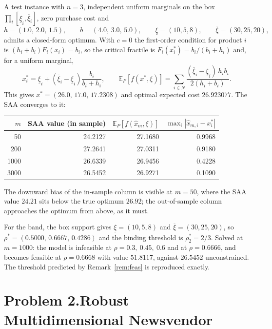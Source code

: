 \documentclass[11pt]{article}
\theoremstyle{definition}
\begin{document}
A test instance with $n = 3$, independent uniform marginals on the box
$\prod_i [\underline{\xi}_i,\overline{\xi}_i]$, zero purchase cost and
\[
  h = (1.0,\,2.0,\,1.5), \qquad b = (4.0,\,3.0,\,5.0), \qquad
  \underline{\xi} = (10,5,8), \qquad \overline{\xi} = (30,25,20),
\]
admits a closed-form optimum. With $c=0$ the first-order condition for
product $i$ is $(h_i+b_i)F_i(x_i) = b_i$, so the critical fractile is
$F_i(x^{*}_i) = b_i/(b_i+h_i)$ and, for a uniform marginal,
\[
  x^{*}_i = \underline{\xi}_i
    + (\overline{\xi}_i - \underline{\xi}_i)\frac{b_i}{b_i+h_i},
  \qquad
  \mathbb{E}_P[f(x^{*},\xi)]
    = \sum_{i \in N}
      \frac{(\overline{\xi}_i-\underline{\xi}_i)\,h_i b_i}{2(h_i+b_i)} .
\]
This gives $x^{*} = (26.0,\,17.0,\,17.2308)$ and optimal expected cost
$26.923077$. The SAA converges to it:

\begin{center}
\begin{tabular}{@{}rrrr@{}}
\toprule
$m$ & SAA value (in sample) & $\mathbb{E}_P[f(\hat x_m,\xi)]$ &
  $\max_i |\hat x_{m,i} - x^{*}_i|$ \\
\midrule
50   & 24.2127 & 27.1680 & 0.9968 \\
200  & 27.2641 & 27.0311 & 0.9180 \\
1000 & 26.6339 & 26.9456 & 0.4228 \\
3000 & 26.5452 & 26.9271 & 0.1090 \\
\bottomrule
\end{tabular}
\end{center}

The downward bias of the in-sample column is visible at $m=50$, where the
SAA value $24.21$ sits below the true optimum $26.92$; the out-of-sample
column approaches the optimum from above, as it must.

For the band, the box support gives $\underline{\xi} = (10,5,8)$ and
$\overline{\xi} = (30,25,20)$, so
$\rho^{*} = (0.5000,\,0.6667,\,0.4286)$ and the binding threshold is
$\rho^{*}_2 = 2/3$. Solved at $m=1000$: the model is infeasible at
$\rho = 0.3,\ 0.45,\ 0.6$ and at $\rho = 0.6666$, and becomes feasible at
$\rho = 0.6668$ with value $51.8117$, against $26.5452$ unconstrained.
The threshold predicted by Remark~\ref{rem:feas} is reproduced exactly.

\newpage
\section*{Problem 2.\quad Robust Multidimensional Newsvendor
  \quad[40 pts]}
\end{document}

